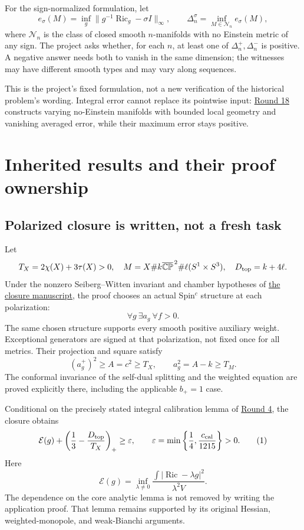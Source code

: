 \documentclass[
  11pt,
]{article}
\begin{document}
For the sign-normalized formulation, let \[
e_\sigma(M)=\inf_g\|g^{-1}\operatorname{Ric}_g-\sigma I\|_\infty,
\qquad
\Delta_n^\sigma=\inf_{M\in\mathcal N_n}e_\sigma(M),
\] where \(\mathcal N_n\) is the class of closed smooth \(n\)-manifolds
with no Einstein metric of any sign. The project asks whether, for each
\(n\), at least one of \(\Delta_n^+,\Delta_n^-\) is positive. A negative
answer needs both to vanish in the same dimension; the witnesses may
have different smooth types and may vary along sequences.

This is the project's fixed formulation, not a new verification of the
historical problem's wording. Integral error cannot replace its
pointwise input: \href{round18_integral_limits.md}{Round 18} constructs
varying no-Einstein manifolds with bounded local geometry and vanishing
averaged error, while their maximum error stays positive.

\hypertarget{inherited-results-and-their-proof-ownership}{%
\section{Inherited results and their proof
ownership}\label{inherited-results-and-their-proof-ownership}}

\hypertarget{polarized-closure-is-written-not-a-fresh-task}{%
\subsection{Polarized closure is written, not a fresh
task}\label{polarized-closure-is-written-not-a-fresh-task}}

Let \[
T_X=2\chi(X)+3\tau(X)>0,\quad
M=X\#k\overline{\mathbb{CP}}^{\,2}\#\ell(S^1\times S^3),\quad
D_{\rm top}=k+4\ell.
\] Under the nonzero Seiberg--Witten invariant and chamber hypotheses of
\href{lebrun_stability_closure.md}{the closure manuscript}, the proof
chooses an actual Spin\(^c\) structure at each polarization: \[
\forall g\ \exists a_g\ \forall f>0.
\] The same chosen structure supports every smooth positive auxiliary
weight. Exceptional generators are signed at that polarization, not
fixed once for all metrics. Their projection and square satisfy \[
(a_g^+)^2\ge A=c^2\ge T_X,\qquad a_g^2=A-k\ge T_M.
\] The conformal invariance of the self-dual splitting and the weighted
equation are proved explicitly there, including the applicable \(b_+=1\)
case.

Conditional on the precisely stated integral calibration lemma of
\href{round4_rigidity.md}{Round 4}, the closure obtains \[
\mathcal E(g)+
\left(\frac13-\frac{D_{\rm top}}{T_X}\right)_+
\ge\varepsilon,\qquad
\varepsilon=\min\left\{\frac14,\frac{c_{\rm cal}}{1215}\right\}>0.
\tag{1}
\] Here \[
\mathcal E(g)=
\inf_{\lambda\ne0}
\frac{\int|\operatorname{Ric}-\lambda g|^2}{\lambda^2V}.
\] The dependence on the core analytic lemma is not removed by writing
the application proof. That lemma remains supported by its original
Hessian, weighted-monopole, and weak-Bianchi arguments.
\end{document}
